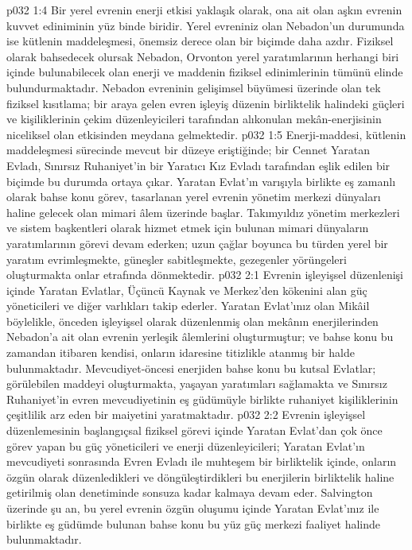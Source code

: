 \vs p032 1:4 Bir yerel evrenin enerji etkisi yaklaşık olarak, ona ait olan aşkın evrenin kuvvet ediniminin yüz binde biridir. Yerel evreniniz olan Nebadon’un durumunda ise kütlenin maddeleşmesi, önemsiz derece olan bir biçimde daha azdır. Fiziksel olarak bahsedecek olursak Nebadon, Orvonton yerel yaratımlarının herhangi biri içinde bulunabilecek olan enerji ve maddenin fiziksel edinimlerinin tümünü elinde bulundurmaktadır. Nebadon evreninin gelişimsel büyümesi üzerinde olan tek fiziksel kısıtlama; bir araya gelen evren işleyiş düzenin birliktelik halindeki güçleri ve kişiliklerinin çekim düzenleyicileri tarafından alıkonulan mekân\hyp{}enerjisinin niceliksel olan etkisinden meydana gelmektedir.
\vs p032 1:5 Enerji\hyp{}maddesi, kütlenin maddeleşmesi sürecinde mevcut bir düzeye eriştiğinde; bir Cennet Yaratan Evladı, Sınırsız Ruhaniyet’in bir Yaratıcı Kız Evladı tarafından eşlik edilen bir biçimde bu durumda ortaya çıkar. Yaratan Evlat’ın varışıyla birlikte eş zamanlı olarak bahse konu görev, tasarlanan yerel evrenin yönetim merkezi dünyaları haline gelecek olan mimari âlem üzerinde başlar. Takımyıldız yönetim merkezleri ve sistem başkentleri olarak hizmet etmek için bulunan mimari dünyaların yaratımlarının görevi devam ederken; uzun çağlar boyunca bu türden yerel bir yaratım evrimleşmekte, güneşler sabitleşmekte, gezegenler yörüngeleri oluşturmakta onlar etrafında dönmektedir.
\vs p032 2:1 Evrenin işleyişsel düzenlenişi içinde Yaratan Evlatlar, Üçüncü Kaynak ve Merkez’den kökenini alan güç yöneticileri ve diğer varlıkları takip ederler. Yaratan Evlat’ınız olan Mikâil böylelikle, önceden işleyişsel olarak düzenlenmiş olan mekânın enerjilerinden Nebadon’a ait olan evrenin yerleşik âlemlerini oluşturmuştur; ve bahse konu bu zamandan itibaren kendisi, onların idaresine titizlikle atanmış bir halde bulunmaktadır. Mevcudiyet\hyp{}öncesi enerjiden bahse konu bu kutsal Evlatlar; görülebilen maddeyi oluşturmakta, yaşayan yaratımları sağlamakta ve Sınırsız Ruhaniyet’in evren mevcudiyetinin eş güdümüyle birlikte ruhaniyet kişiliklerinin çeşitlilik arz eden bir maiyetini yaratmaktadır.
\vs p032 2:2 Evrenin işleyişsel düzenlemesinin başlangıçsal fiziksel görevi içinde Yaratan Evlat’dan çok önce görev yapan bu güç yöneticileri ve enerji düzenleyicileri; Yaratan Evlat’ın mevcudiyeti sonrasında Evren Evladı ile muhteşem bir birliktelik içinde, onların özgün olarak düzenledikleri ve döngüleştirdikleri bu enerjilerin birliktelik haline getirilmiş olan denetiminde sonsuza kadar kalmaya devam eder. Salvington üzerinde şu an, bu yerel evrenin özgün oluşumu içinde Yaratan Evlat’ınız ile birlikte eş güdümde bulunan bahse konu bu yüz güç merkezi faaliyet halinde bulunmaktadır.
